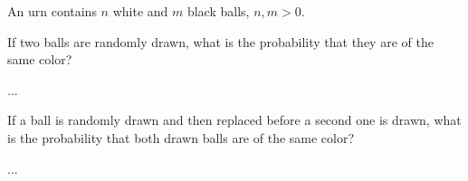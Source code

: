 \documentclass[a4paper,10pt,landscape,twocolumn]{scrartcl}
\begin{document}

\begin{exercise}[]
  An urn contains $n$ white and $m$ black balls, $n, m > 0$.
  
  \begin{subex}
    If two balls are randomly drawn, what is the probability that they are of
    the same color?
  \end{subex}
  
  \begin{solution}
    ...  
  \end{solution}
  
  
  \begin{subex}
    If a ball is randomly drawn and then replaced before a second one is drawn,
    what is the probability that both drawn balls are of the same color?
  \end{subex}	
  
  \begin{solution}
    ...  
  \end{solution}
  
\end{exercise}

\end{document}
